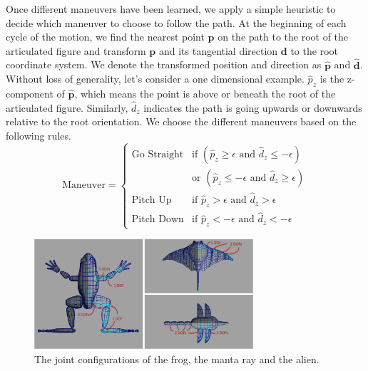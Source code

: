 Once different maneuvers have been learned, we apply a simple heuristic to
decide which maneuver to choose to follow the path. At the beginning of
each cycle of the motion, we find the nearest point $\mathbf{p}$ on the
path to the root of the articulated figure and transform $\mathbf{p}$ and
its tangential direction $\mathbf{d}$ to the root coordinate system. We
denote the transformed position and direction as $\hat{\mathbf{p}}$ and
$\hat{\mathbf{d}}$. Without loss of generality, let's consider a one
dimensional example. $\hat{p}_z$ is the z-component of $\hat{\mathbf{p}}$,
which means the point is above or beneath the root of the articulated
figure. Similarly, $\hat{d}_z$ indicates the path is going upwards or
downwards relative to the root orientation. We choose the different
maneuvers based on the following rules.
\begin{displaymath}
\textrm{Maneuver}=\left\{\begin{array}{ll}
\textrm{Go Straight} & \textrm{if } (\hat{p}_z \geq \epsilon \textrm{ and }\hat{d}_z \leq -\epsilon)\\
                     & \textrm{or } ( \hat{p}_z \leq -\epsilon \textrm{ and } \hat{d}_z \geq \epsilon)\\
\textrm{Pitch Up} & \textrm{if } \hat{p}_z > \epsilon \textrm{ and } \hat{d}_z > \epsilon\\
\textrm{Pitch Down} & \textrm{if }\hat{p}_z < -\epsilon \textrm{ and } \hat{d}_z < -\epsilon
\end{array}\right.
\end{displaymath}

\begin{figure}[!t]
\centering
\includegraphics[width=3.2in]{figures/skels.eps}
\caption{The joint configurations of the frog, the manta ray and the alien.}
\label{fig:skels}
\end{figure}


